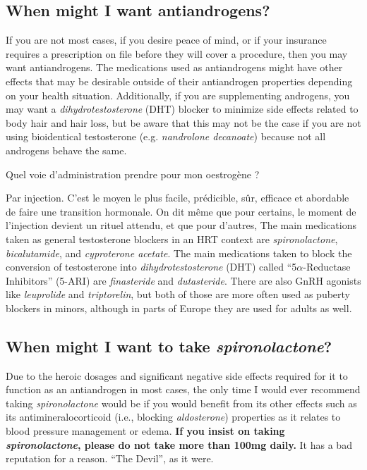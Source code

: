 \documentclass{article}
\begin{document}
\subsection{When might I want antiandrogens?}

If you are not most cases, if you desire peace of mind, or if your insurance requires a prescription on file before they will cover a procedure, then you may want antiandrogens. The medications used as antiandrogens might have other effects that may be desirable outside of their antiandrogen properties depending on your health situation. Additionally, if you are supplementing androgens, you may want a \textit{dihydrotestosterone }(DHT) blocker to minimize side effects related to body hair and hair loss, but be aware that this may not be the case if you are not using bioidentical testosterone (e.g. \textit{nandrolone decanoate}) because not all androgens behave the same.


Quel voie d'administration prendre pour mon oestrogène ?

Par injection. C'est le moyen le plus facile, prédicible, sûr, efficace et abordable de faire une transition hormonale. On dit même que pour certains, le moment de l'injection devient un rituel attendu, et que pour d'autres,  
The main medications taken as general testosterone blockers in an HRT context are \textit{spironolactone}, \textit{bicalutamide}, and \textit{cyproterone acetate}. The main medications taken to block the conversion of testosterone into \textit{dihydrotestosterone} (DHT) called “5$\alpha$-Reductase Inhibitors” (5-ARI) are \textit{finasteride} and \textit{dutasteride}. There are also GnRH agonists like \textit{leuprolide} and \textit{triptorelin}, but both of those are more often used as puberty blockers in minors, although in parts of Europe they are used for adults as well.

\subsection{When might I want to take \textit{spironolactone}?}

Due to the heroic dosages and significant negative side effects required for it to function as an antiandrogen in most cases, the only time I would ever recommend taking \textit{spironolactone} would be if you would benefit from its other effects such as its antimineralocorticoid (i.e., blocking \textit{aldosterone}) properties as it relates to blood pressure management or edema. \textbf{If you insist on taking \textit{spironolactone}, please do not take more than 100mg daily.} It has a bad reputation for a reason. “The Devil”, as it were.
\end{document}
